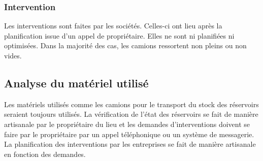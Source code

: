 \subsubsection{Intervention}

Les interventions sont faites par les sociétés. Celles-ci ont lieu après la planification issue d'un appel de propriétaire. Elles ne sont ni planifiées ni optimisées. Dans la majorité des cas, les camions ressortent non pleins ou non vides.

\subsection{Analyse du matériel utilisé}

Les matériels utilisés comme les camions pour le transport du stock des réservoirs seraient toujours utilisés. La vérification de l'état des réservoirs se fait de manière artisanale par le propriétaire du lieu et les demandes d'interventions doivent se faire par le propriétaire par un appel téléphonique ou un système de messagerie. La planification des interventions par les entreprises se fait de manière artisanale en fonction des demandes.

\vfill
\pagebreak
